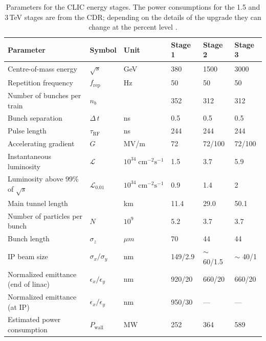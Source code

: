 \begin{table}
\caption[CLIC beam parameters]{Parameters for the CLIC energy stages. The power consumptions for the 1.5 and 3\,TeV stages are from the CDR; depending on the details of the upgrade they can change at the percent level \cite{CLIC:2016zwp}.}
\label{table:clicbeamparameters}
\centering
\begin{tabular}{l l l l l l}
\toprule
\textbf{Parameter}                  & \textbf{Symbol}         & \textbf{Unit}& \textbf{Stage 1} & \textbf{Stage 2} & \textbf{Stage 3} \\
\midrule
Centre-of-mass energy               & $\sqrt{s}$                &GeV                                        & 380 & 1500 & 3000\\
Repetition frequency                & $f_{\text{rep}}$        &Hz                                         & 50 & 50 & 50\\
Number of bunches per train         & $n_{b}$                 &                                           & 352 & 312 & 312\\
Bunch separation                    & $\Delta\,t$             &ns                                         & 0.5 & 0.5 & 0.5\\
Pulse length                        & $\tau_{\text{RF}}$      &ns                                         &244 &244 &244\\
\midrule
Accelerating gradient               & $G$                     &MV/m                                       & 72 & 72/100 & 72/100\\
\midrule
Instantaneous luminosity                    & $\mathcal{L}$           &$10^{34}\;\text{cm}^{-2}\text{s}^{-1}$     & 1.5 & 3.7 & 5.9 \\
Luminosity above 99\% of $\sqrt{s}$   & $\mathcal{L}_{0.01}$    &$10^{34}\;\text{cm}^{-2}\text{s}^{-1}$     & 0.9 & 1.4 & 2\\
\midrule
Main tunnel length                  &                         &km                                         & 11.4 & 29.0 & 50.1\\
Number of particles per bunch                    & $N$                     &$10^9$                                     & 5.2 & 3.7 & 3.7\\
Bunch length                        & $\sigma_z$              &$\mu m$                                  & 70 & 44 & 44\\
IP beam size                        & $\sigma_x/\sigma_y$     &nm                                         & 149/2.9 & $\sim$ 60/1.5 & $\sim$ 40/1\\
Normalized emittance (end of linac) & $\epsilon_x/\epsilon_y$ &nm                                         & 920/20 & 660/20 & 660/20\\
Normalized emittance (at IP)        & $\epsilon_x/\epsilon_y$ &nm                                         & 950/30 & ---    &---\\
Estimated power consumption                        & $P_{\text{wall}}$         &MW                                & 252    & 364    & 589\\
\bottomrule
\end{tabular}
\end{table}

